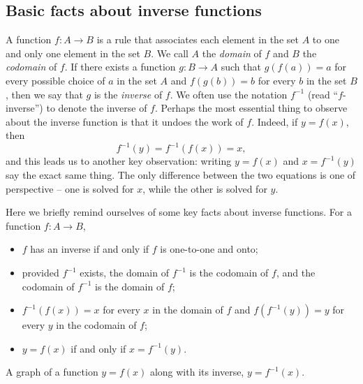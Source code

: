 \subsection*{Basic facts about inverse functions}

A function  $f : A \to B$ is a rule that associates each element in the set $A$ to one and only one element in the set $B$.  We call $A$ the \emph{domain}  of $f$ and $B$ the \emph{codomain} of $f$.  If there exists a function $g : B \to A$ such that $g(f(a)) = a$ for every possible choice of $a$ in the set $A$ and $f(g(b)) = b$ for every $b$ in the set $B$, then we say that $g$ is the \emph{inverse} of $f$.  We often use the notation $f^{-1}$ (read ``$f$-inverse'') to denote the inverse of $f$.  Perhaps the most essential thing to observe about the inverse function is that it undoes the work of $f$.  Indeed, if $y = f(x)$, then
$$f^{-1}(y) = f^{-1}(f(x)) = x,$$
and this leads us to another key observation:  writing $y = f(x)$ and $x = f^{-1}(y)$ say the exact same thing.  The only difference between the two equations is one of perspective -- one is solved for $x$, while the other is solved for $y$.

Here we briefly remind ourselves of some key facts about inverse functions.  For a function $f : A \to B$, 
\begin{itemize}
\item $f$ has an inverse if and only if $f$ is one-to-one and onto;

\item provided $f^{-1}$ exists, the domain of $f^{-1}$ is the codomain of $f$, and the codomain of $f^{-1}$ is the domain of $f$;

\item $f^{-1}(f(x)) = x$ for every $x$ in the domain of $f$ and $f(f^{-1}(y)) = y$ for every $y$ in the codomain of $f$;

\item $y = f(x)$ if and only if $x = f^{-1}(y)$.
\end{itemize}

\begin{marginfigure} %
\caption{A graph of a function $y = f(x)$ along with its inverse, $y = f^{-1}(x)$.} \label{F:2.6.InversePlot}
\end{marginfigure}

